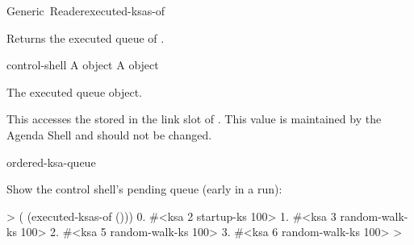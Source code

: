 \documentclass[10pt,twoside,english,pdftex]{article}
\begin{document}
\begin{functiondoc}{Generic~Reader}{executed-ksas-of}{ 
    \returns{} }
%
%

\fnsyntax

\fnpurpose Returns the executed  queue of .

\fnmethods
{}

\fnpackage {}

\fnmodule {}

\fnargs
\begin{args}{control-shell}
 A  object
 A \textbf{} object
\end{args}

\fnreturns The executed  queue object.

\fndescription 
%
This  accesses the \textbf{} stored
in the  link slot of . This value is maintained
by the Agenda Shell and should not be changed.

\begin{alsos}{ordered-ksa-queue}
\also[ksa]
\also[on-queue-p]
\also[queue]
\end{alsos}

\fnexample
%
%
%
%
%
Show the control shell's pending  queue (early in a
 run):
%
\W\supp
\begin{example}
  >  ( (executed-ksas-of ()))
      0. #<ksa 2 startup-ks 100>
      1. #<ksa 3 random-walk-ks 100>
      2. #<ksa 5 random-walk-ks 100>
      3. #<ksa 6 random-walk-ks 100>
  >
\end{example}

\end{functiondoc}

\end{document}

